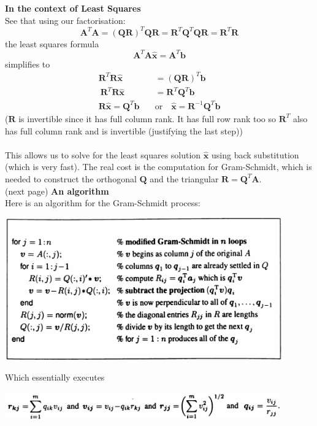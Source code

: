 \documentclass{report}
\begin{document}
\textbf{In the context of Least Squares}\\
See that using our factorisation:
\begin{equation*}
\bm{A}^T\bm A=(\bm{QR})^T\bm{QR}=\bm R^T\bm Q^T\bm{QR}=\bm R^T\bm R
\end{equation*}
the least squares formula
\begin{equation*}
\bm{A}^T\bm A\hat{\bm x}=\bm{A}^T\bm b
\end{equation*}
simplifies to
\begin{align*}
\bm R^T\bm R\hat{\bm x}&=(\bm{QR})^T\bm b\\\
\bm R^T\bm R\hat{\bm x}&=\bm R^T\bm Q^T\bm b\\
\bm R\hat{\bm x}=\bm Q^T\bm b\quad&\text{or}\quad\hat{\bm x}=\bm R^{-1}\bm Q^T\bm b
\end{align*}
($\bm R$ is invertible since it has full column rank. It has full row rank too so $\bm R^T$ also has full column rank and is invertible (justifying the last step))\\
\vspace{1mm}\\
This allows us to solve for the least squares solution $\hat{\bm x}$ using back substitution (which is very fast). The real cost is the computation for Gram-Schmidt,
which is needed to construct the orthogonal $\bm Q$ and the triangular $\bm R=\bm Q^T\bm A$.\\
(next page)\newpage
\noindent\textbf{An algorithm}\\
Here is an algorithm for the Gram-Schmidt process:
\begin{center}
\includegraphics[width=12cm]{92}
\end{center}
Which essentially executes
\begin{center}
\includegraphics[width=12cm]{93}
\end{center}
\end{document}
